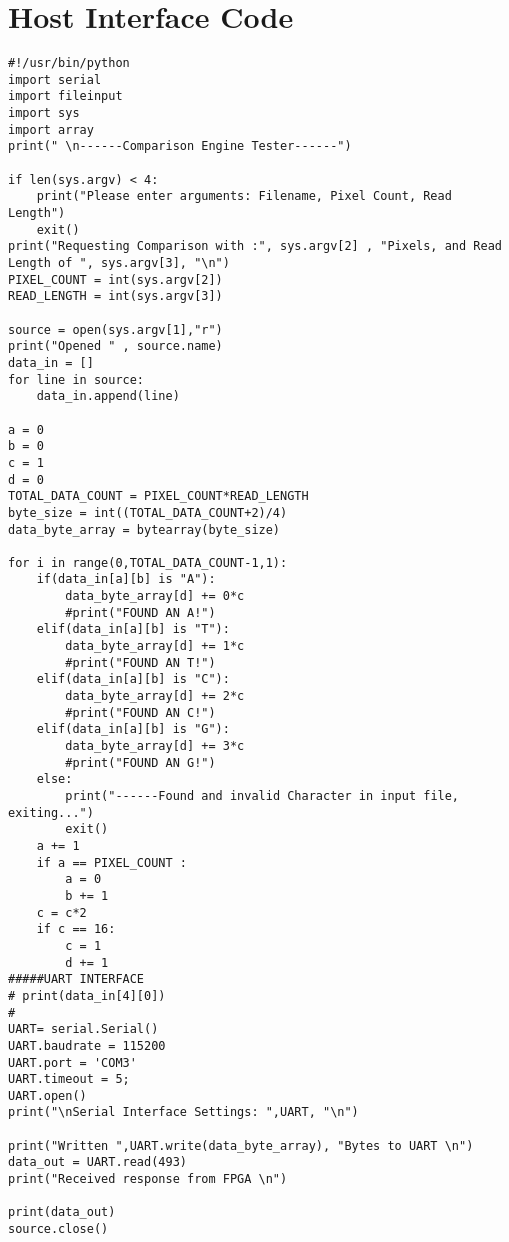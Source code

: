 \renewcommand{\baselinestretch}{1.5}
\chapter{Host Interface Code}
\label{App:Host_Software}
\lstset{language=python, numbers=left, showspaces=false,
    showstringspaces=false, tabsize=4, breaklines=true, basicstyle=\tiny, captionpos=b, numbersep=5pt }
\begin{lstlisting}[frame=single,label=listing:IDT]
#!/usr/bin/python
import serial
import fileinput
import sys
import array
print(" \n------Comparison Engine Tester------")

if len(sys.argv) < 4:
	print("Please enter arguments: Filename, Pixel Count, Read Length")
	exit()
print("Requesting Comparison with :", sys.argv[2] , "Pixels, and Read Length of ", sys.argv[3], "\n")
PIXEL_COUNT = int(sys.argv[2])
READ_LENGTH = int(sys.argv[3])

source = open(sys.argv[1],"r")
print("Opened " , source.name)
data_in = []
for line in source:
	data_in.append(line)

a = 0
b = 0
c = 1
d = 0
TOTAL_DATA_COUNT = PIXEL_COUNT*READ_LENGTH
byte_size = int((TOTAL_DATA_COUNT+2)/4)
data_byte_array = bytearray(byte_size)

for i in range(0,TOTAL_DATA_COUNT-1,1):
	if(data_in[a][b] is "A"):
		data_byte_array[d] += 0*c
		#print("FOUND AN A!")
	elif(data_in[a][b] is "T"):
		data_byte_array[d] += 1*c
		#print("FOUND AN T!")	
	elif(data_in[a][b] is "C"):
		data_byte_array[d] += 2*c
		#print("FOUND AN C!")	
	elif(data_in[a][b] is "G"):
		data_byte_array[d] += 3*c
		#print("FOUND AN G!")
	else:
		print("------Found and invalid Character in input file, exiting...")
		exit()
	a += 1
	if a == PIXEL_COUNT : 
		a = 0
		b += 1
	c = c*2
	if c == 16:
		c = 1
		d += 1
#####UART INTERFACE
# print(data_in[4][0])
#
UART= serial.Serial()
UART.baudrate = 115200
UART.port = 'COM3'
UART.timeout = 5;
UART.open()
print("\nSerial Interface Settings: ",UART, "\n")

print("Written ",UART.write(data_byte_array), "Bytes to UART \n")
data_out = UART.read(493)
print("Received response from FPGA \n")

print(data_out)
source.close()
\end{lstlisting}
